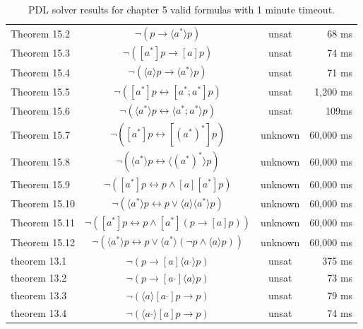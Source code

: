 \documentclass[12pt,a4paper]{article}
\begin{document}
\begin{table}[H]
\begin{tabular}{lccr}
Theorem 15.2 & $\neg (p \rightarrow   \langle  a^{*} \rangle   p)$  & unsat & 68 ms \\
	

Theorem 15.3 & $\neg ([a^{*}]p \rightarrow  [a]p)$  & unsat & 74 ms \\
	

Theorem 15.4 & $\neg ( \langle  a \rangle  p \rightarrow   \langle  a^{*} \rangle  p)$  & unsat  & 71 ms \\
	

Theorem 15.5 & $\neg ([a^{*}]p  \leftrightarrow  [a^{*};a^{*}]p)$  & unsat &  1,200 ms\\
	

Theorem 15.6 & $\neg ( \langle  a^{*} \rangle  p  \leftrightarrow   \langle  a^{*};a^{*} \rangle  p)$  & unsat & 109ms \\
	

Theorem 15.7 & $\neg ([a^{*}]p  \leftrightarrow  [(a^*)^*]p)$  & unknown   & 60,000 ms \\
	

Theorem 15.8 & $\neg ( \langle  a^{*} \rangle  p  \leftrightarrow   \langle  (a^*)^* \rangle  p)$  & unknown   & 60,000 ms \\
	

Theorem 15.9 & $\neg ([a^{*}]p  \leftrightarrow  p \wedge [a][a^{*}]p)$  & unknown   & 60,000 ms \\
	

Theorem 15.10 & $\neg ( \langle  a^{*} \rangle  p  \leftrightarrow  p \vee  \langle  a \rangle   \langle  a^{*} \rangle  p)$  & unknown   & 60,000 ms \\
	

Theorem 15.11 & $\neg ([a^{*}]p  \leftrightarrow  p \wedge [a^{*}](p \rightarrow  [a]p))$  & unknown   & 60,000 ms \\
	

Theorem 15.12 & $\neg ( \langle  a^{*} \rangle  p  \leftrightarrow  p \vee  \langle  a^{*} \rangle  (\neg  p \wedge  \langle  a \rangle  p))$  & unknown   & 60,000 ms \\
theorem 13.1 & $\neg (p \rightarrow  [a] \langle  a^{\_} \rangle  p)$  & unsat & 375 ms \\
theorem 13.2 & $\neg (p \rightarrow  [a^{\_}] \langle  a \rangle  p)$  & unsat & 73 ms \\
theorem 13.3 & $\neg ( \langle  a \rangle  [a^{\_}]p \rightarrow  p)$  & unsat & 79 ms \\
theorem 13.4 & $\neg ( \langle  a^{\_} \rangle  [a]p \rightarrow  p)$  & unsat & 74 ms \\  
\bottomrule 
\end{tabular}
\caption{PDL solver results for chapter 5 valid formulas with 1 minute timeout.}
\label{tab:benchmark}
\end{table}




\end{document}
